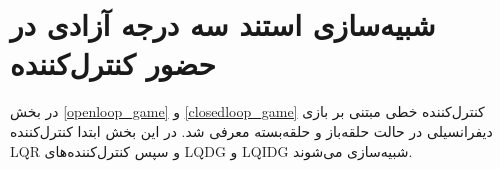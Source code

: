 \section{شبیه‌سازی استند سه درجه آزادی در حضور کنترل‌کننده}\label{MIL}
در بخش
\ref{openloop_game}
و
\ref{closedloop_game}
کنترل‌کننده خطی مبتنی بر بازی دیفرانسیلی در حالت حلقه‌باز و حلقه‌بسته معرفی شد. در این بخش ابتدا کنترل‌کننده LQR و سپس کنترل‌کننده‌های LQDG و LQIDG شبیه‌سازی می‌شوند.
